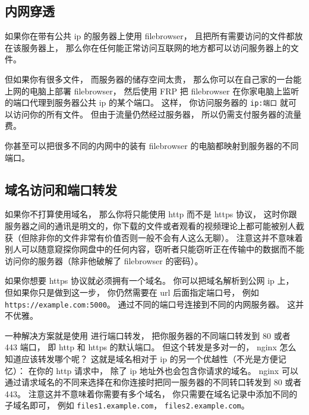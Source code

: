 \subsection{内网穿透}

如果你在带有公共 ip 的服务器上使用 filebrowser， 且把所有需要访问的文件都放在该服务器上， 那么你在任何能正常访问互联网的地方都可以访问服务器上的文件。

但如果你有很多文件， 而服务器的储存空间太贵， 那么你可以在自己家的一台能上网的电脑上部署 filebrowser， 然后使用 FRP 把 filebrowser 在你家电脑上监听的端口代理到服务器公共 ip 的某个端口。 这样， 你访问服务器的 \verb|ip:端口| 就可以访问你的所有文件。 但由于流量仍然经过服务器， 所以仍需支付服务器的流量费。

你甚至可以把很多不同的内网中的装有 filebrowser 的电脑都映射到服务器的不同端口。

\subsection{域名访问和端口转发}

如果你不打算使用域名， 那么你将只能使用 http 而不是 https 协议， 这时你跟服务器之间的通讯是明文的，你下载的文件或者观看的视频理论上都可能被别人截获（但除非你的文件非常有价值否则一般不会有人这么无聊）。 注意这并不意味着别人可以随意窥探你网盘中的任何内容，窃听者只能窃听正在传输中的数据而不能访问你的服务器（除非他破解了 filebrowser 的密码）。

如果你想要 https 协议就必须拥有一个域名。 你可以把域名解析到公网 ip 上， 但如果你只是做到这一步， 你仍然需要在 url 后面指定端口号， 例如 \verb|https://example.com:5000|。 通过不同的端口号连接到不同的内网服务器。 这并不优雅。

一种解决方案就是使用  进行端口转发， 把你服务器的不同端口转发到 80 或者 443 端口， 即 http 和 https 的默认端口。 但这个转发是多对一的， nginx 怎么知道应该转发哪个呢？ 这就是域名相对于 ip 的另一个优越性（不光是方便记忆）： 在你的 http 请求中， 除了 ip 地址外也会包含你请求的域名。 nginx 可以通过请求域名的不同来选择在和你连接时把同一服务器的不同转口转发到 80 或者 443。 注意这并不意味着你需要有多个域名， 你只需要在域名记录中添加不同的子域名即可， 例如 \verb|files1.example.com|， \verb|files2.example.com|。

